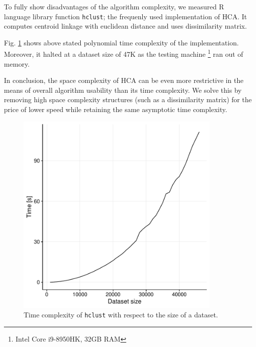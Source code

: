 To fully show disadvantages of the algorithm complexity, we measured R language library function \texttt{hclust}; the frequenly used implementation of HCA. It computes centroid linkage with euclidean distance and uses dissimilarity matrix. 

Fig. \ref{fig01:hclust} shows above stated polynomial time complexity of the implementation. Moreover, it halted at a dataset size of 47K as the testing machine \footnote{Intel Core i9-8950HK, 32GB RAM} ran out of memory.

In conclusion, the space complexity of HCA can be even more restrictive in the means of overall algorithm usability than its time complexity. We solve this by removing high space complexity structures (such as a dissimilarity matrix) for the price of lower speed while retaining the same asymptotic time complexity.

\begin{figure}\centering
	\includegraphics[width=10cm]{img/hclust}
	\caption{Time complexity of \texttt{hclust} with respect to the size of a dataset.}
	\label{fig01:hclust}
\end{figure}
